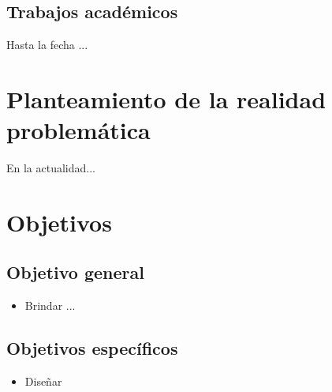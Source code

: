 \subsection{Trabajos académicos}
\begin{adjustwidth}{2.4em}{0em}
Hasta la fecha ...
\end{adjustwidth}


\section{Planteamiento de la realidad problemática}
\begin{adjustwidth}{2.4em}{0em}
En la actualidad...
\end{adjustwidth}

\section{Objetivos}
\subsection{Objetivo general}
\begin{adjustwidth}{2.4em}{0em}
\begin{itemize}
	\item Brindar ...
\end{itemize}
\end{adjustwidth}

\subsection{Objetivos específicos}
\begin{adjustwidth}{2.4em}{0em}
\begin{itemize}
	\item Diseñar 
\end{itemize}
\end{adjustwidth}

